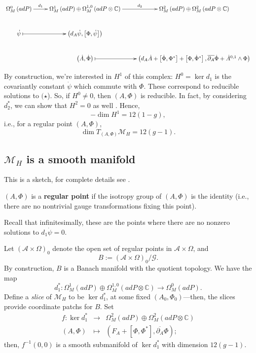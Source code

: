 \[
\xymatrix{\Omega_{M}^{0}\left(adP\right)\ar[r]^-{d_{1}} & \Omega_{M}^{1}\left(adP\right)\oplus\Omega_{M}^{1,0}\left(adP\otimes\mathbb{C}\right)\ar[r]^-{d_{2}} &
\Omega_{M}^{2}\left(adP\right)\oplus\Omega_{M}^{2}\left(adP\otimes\mathbb{C}\right)\\
\dot{\psi}\ar@{|->}[r] & \left(d_{A}\dot{\psi},\left[\Phi,\dot{\psi}\right]\right)\\
 & \left(\dot{A},\dot{\Phi}\right)\ar@{|->}[r] &
 \left(d_{A}\dot{A}+\left[\dot{\Phi},\Phi^{*}\right]+\left[\Phi,\dot{\Phi}^{*}\right],\overline{\partial_{A}}\dot{\Phi}+\dot{A}^{0,1}\wedge\Phi\right)
}
\]

By construction, we're interested in $H^{1}$ of this complex: $H^{0}=\ker d_{1}$
is the covariantly constant $\dot{\psi}$ which commute with $\Phi$.
These correspond to reducible solutions to $(\star$). So, if $H^{0}\neq0$,
then $\left(A,\Phi\right)$ is reducible. In fact, by considering
$d_{2}^{*}$, we can show that $H^{2}=0$ as well \cite{H1}. Hence,
\[
-\dim H^{1}=12\left(1-g\right),
\]
i.e., for a regular point $\left(A,\Phi\right)$,
\[
\boxed{\dim T_{\left(A,\Phi\right)}\mathcal{M}_{H}=12\left(g-1\right)}.
\]



\subsection{$\mathcal{M}_{H}$ is a smooth manifold}

This is a sketch, for complete details see \cite{H1}.
\begin{defn}
$\left(A,\Phi\right)$ is a \textbf{regular point} if the isotropy
group of $\left(A,\Phi\right)$ is the identity (i.e., there are no
nontrivial gauge transformations fixing this point).
\end{defn}
Recall that infinitesimally, these are the points where there are
no nonzero solutions to $d_{1}\dot{\psi}=0$.

Let $\left(\mathcal{A}\times\Omega\right)_{0}$ denote the open set
of regular points in $\mathcal{A}\times\Omega$, and
\[
B:=\left(\mathcal{A}\times\Omega\right)_{0}/\mathcal{G}.
\]
By construction, $B$ is a Banach manifold with the quotient topology.
We have the map
\[
d_{1}^{*}:\Omega_{M}^{1}\left(adP\right)\oplus\Omega_{M}^{1,0}\left(adP\otimes\mathbb{C}\right)\longrightarrow\Omega_{M}^{0}\left(adP\right).
\]
Define a \emph{slice} of $\mathcal{M}_{H}$ to be $\ker d_{1}^{*}$,
at some fixed $\left(A_{0},\Phi_{0}\right)$---then, the slices provide
coordinate patchs for $B$. Set
\begin{eqnarray*}
f:\ker d_{1}^{*} & \longrightarrow & \Omega_{M}^{2}\left(adP\right)\oplus\Omega_{M}^{2}\left(adP\otimes\mathbb{C}\right)\\
\left(A,\Phi\right) & \mapsto & \left(F_{A}+\left[\Phi,\Phi^{*}\right],\overline{\partial_{A}}\Phi\right);
\end{eqnarray*}
then, $f^{-1}\left(0,0\right)$ is a smooth submanifold of $\ker d_{1}^{*}$
with dimension $12(g-1)$.

